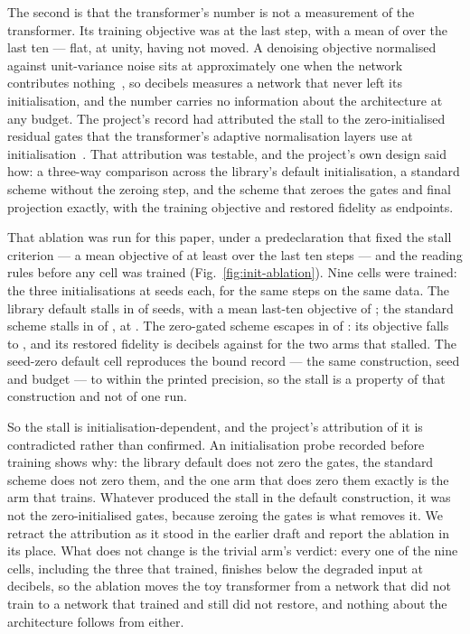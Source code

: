 The second is that the transformer's number is not a measurement of the
transformer. Its training objective was \ToyTransLoss{} at the last step, with a
mean of \ToyTransLastTen{} over the last ten --- flat, at unity, having not
moved. A denoising objective normalised against unit-variance noise sits at
approximately one when the network contributes nothing~\cite{ho2020ddpm}, so
\ToyTrans{} decibels measures a network that never left its initialisation, and
the number carries no information about the architecture at any budget. The
project's record had attributed the stall to the zero-initialised residual
gates that the transformer's adaptive normalisation layers use at
initialisation~\cite{peebles2023dit}. That attribution was testable, and the
project's own design said how: a three-way comparison across the library's
default initialisation, a standard scheme without the zeroing step, and the
scheme that zeroes the gates and final projection exactly, with the training
objective and restored fidelity as endpoints.

That ablation was run for this paper, under a predeclaration that fixed the
stall criterion --- a mean objective of at least \InitThreshold{} over the last
ten steps --- and the reading rules before any cell was trained
(Fig.~\ref{fig:init-ablation}). Nine cells were trained: the three
initialisations at \InitSeeds{} seeds each, for the same \InitSteps{} steps on
the same data. The library default stalls in \InitDefaultStall{} of
\InitSeeds{} seeds, with a mean last-ten objective of \InitDefaultLoss{}; the
standard scheme stalls in \InitStandardStall{} of \InitSeeds{}, at
\InitStandardLoss{}. The zero-gated scheme escapes in \InitZeroEscape{} of
\InitSeeds{}: its objective falls to \InitZeroLoss{}, and its restored fidelity
is \InitZeroPsnr{} decibels against \InitStallPsnr{} for the two arms that
stalled. The seed-zero default cell reproduces the bound record --- the same
construction, seed and budget --- to within the printed precision, so the
stall is a property of that construction and not of one run.

So the stall is initialisation-dependent, and the project's attribution of it
is contradicted rather than confirmed. An initialisation probe recorded before
training shows why: the library default does not zero the gates, the standard
scheme does not zero them, and the one arm that does zero them exactly is the
arm that trains. Whatever produced the stall in the default construction, it
was not the zero-initialised gates, because zeroing the gates is what removes
it. We retract the attribution as it stood in the earlier draft and report the
ablation in its place. What does not change is the trivial arm's verdict: every
one of the nine cells, including the three that trained, finishes below the
degraded input at \IdentityPsnr{} decibels, so the ablation moves the toy
transformer from a network that did not train to a network that trained and
still did not restore, and nothing about the architecture follows from either.

